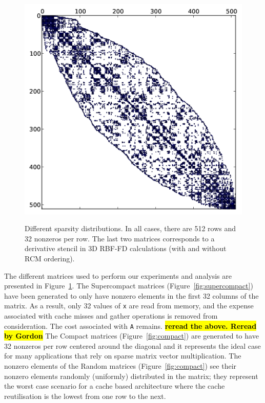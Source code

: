 \documentclass[10pt,conference,compsocconf]{IEEEtran}
\newcommand{\todo}[1]{{\color{red}\textbf{\hl{#1}}\xspace}}
\begin{document}
\begin{figure}[tbh]
\begin{center}
{      \label{fig:rbf3drcm}
      \includegraphics[width=\ww]{figures/kd-tree-3d-rcm-crop.png}}%
  \end{center}
  
  \caption{Different sparsity distributions. In all cases, there are
    512 rows and 32 nonzeros per row. The last two matrices
    corresponds to a derivative stencil in 3D RBF-FD
    calculations (with and without RCM ordering).}
  \label{fig:spy_plots}
\end{figure}

The different matrices used to perform our experiments and analysis
are presented in Figure~\ref{fig:spy_plots}. The
Supercompact matrices (Figure~\ref{fig:supercompact}) have been
generated to only have nonzero elements in the first 32 columns of
the matrix. As a result, only 32 values of {\tt x} are read
from memory, and the expense associated with cache misses and gather
operations is removed from consideration. The cost associated with 
{\tt A} remains.   \todo{reread the above. Reread by Gordon}
The Compact matrices
(Figure~\ref{fig:compact}) are generated to have 32 nonzeros per row
centered around the diagonal and it represents the ideal case for many
applications that rely on sparse matrix vector multiplication. The nonzero
elements of the Random
matrices (Figure~\ref{fig:compact}) see their nonzero elements
randomly (uniformly) distributed in the matrix; they represent the
worst case scenario for a cache based architecture where the cache
reutilisation is the lowest from one row to the next.
\end{document}
